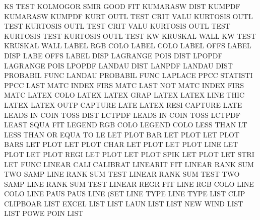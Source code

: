 KS       TEST                           KOLMOGOR SMIR GOOD FIT
KUMARASW DIST                           KUMPDF
KUMARASW                                KUMPDF
KURT     OUTL TEST CRIT VALU            KURTOSIS OUTL TEST
KURTOSIS OUTL TEST CRIT VALU            KURTOSIS OUTL TEST
KURTOSIS TEST                           KURTOSIS OUTL TEST
KW                                      KRUSKAL  WALL
KW       TEST                           KRUSKAL  WALL
LABEL    RGB  COLO                      LABEL    COLO
LABEL    OFFS                           LABEL    DISP
LABE     OFFS                           LABEL    DISP
LAGRANGE POIS DIST                      LPOPDF
LAGRANGE POIS                           LPOPDF
LANDAU   DIST                           LANPDF
LANDAU   DIST                           PROBABIL FUNC
LANDAU                                  PROBABIL FUNC
LAPLACE  PPCC                           STATISTI PPCC
LAST     MATC                           INDEX    FIRS MATC
LAST     NOT  MATC                      INDEX    FIRS MATC
LATEX    COLO                           LATEX
LATEX    GRAP                           LATEX
LATEX    LINE THIC                      LATEX
LATEX    OUTP                           CAPTURE  LATE
LATEX    RESI                           CAPTURE  LATE
LEADS    IN   COIN TOSS DIST            LCTPDF
LEADS    IN   COIN TOSS                 LCTPDF
LEAST    SQUA                           FIT
LEGEND   RGB  COLO                      LEGEND   COLO
LESS     THAN                           LT
LESS     THAN OR   EQUA TO              LE
LET      PLOT BAR                       LET      PLOT
LET      PLOT BARS                      LET      PLOT
LET      PLOT CHAR                      LET      PLOT
LET      PLOT LINE                      LET      PLOT
LET      PLOT REGI                      LET      PLOT
LET      PLOT SPIK                      LET      PLOT
LET      STRI                           LET      FUNC
LINEAR   CALI                           CALIBRAT
LINEARIT                                FIT
LINEAR   RANK SUM                       TWO      SAMP LINE RANK SUM  TEST
LINEAR   RANK SUM  TEST                 TWO      SAMP LINE RANK SUM  TEST
LINEAR   REGR                           FIT
LINE     RGB  COLO                      LINE     COLO
LINE     PAUS                           PAUS     LINE (SET
LINE     TYPE                           LINE     TYPE
LIST     CLIP                           CLIPBOAR
LIST     EXCEL                          LIST
LIST     LAUN                           LIST
LIST     NEW  WIND                      LIST
LIST     POWE POIN                      LIST
